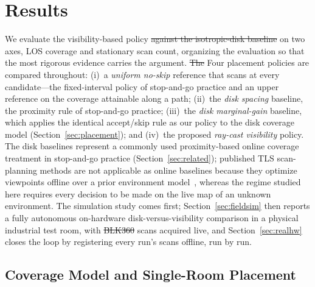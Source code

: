 \documentclass[sensors,article,submit,pdftex,moreauthors]{Definitions/mdpi}
\providecommand{\DIFadd}[1]{{\protect\color{blue} \sf #1}} %
\providecommand{\DIFdel}[1]{{\protect\color{red}\protect\scriptsize\protect\sout{#1}}} %
\providecommand{\DIFaddbegin}{} %
\providecommand{\DIFaddend}{} %
\providecommand{\DIFdelbegin}{} %
\providecommand{\DIFdelend}{} %
\begin{document}
\section{Results}
\label{sec:results}

We evaluate the visibility-based policy \DIFdelbegin \DIFdel{against the isotropic-disk baseline }\DIFdelend on two axes, LOS coverage and
stationary scan count, organizing the evaluation so that the most rigorous
evidence carries the argument. \DIFdelbegin \DIFdel{The }\DIFdelend \DIFaddbegin \DIFadd{Four placement policies are compared throughout:
(i)~a \emph{uniform no-skip} reference that scans at every candidate---the
fixed-interval policy of stop-and-go practice and an upper reference on the
coverage attainable along a path; (ii)~the \emph{disk spacing} baseline, the
proximity rule of stop-and-go practice; (iii)~the \emph{disk marginal-gain}
baseline, which applies the identical accept/skip rule as our policy to the
disk coverage model (Section~\ref{sec:placement}); and (iv)~the proposed
\emph{ray-cast visibility} policy. The disk baselines represent a commonly
used proximity-based online coverage treatment in stop-and-go practice
(Section~\ref{sec:related}); published TLS scan-planning methods are not
applicable as online baselines because they optimize viewpoints offline over a
prior environment model~\cite{tls-scanplanning,dehbi2021,knechtel2025},
whereas the regime studied here requires every decision to be made on the live
map of an unknown environment. The }\DIFaddend simulation study comes first;
Section~\ref{sec:fieldsim} then reports a fully autonomous on-hardware
disk-versus-visibility comparison in a physical industrial test room, with
\DIFdelbegin \DIFdel{BLK360 }\DIFdelend scans acquired live, and Section~\ref{sec:realhw} closes the loop by
registering every run's scans offline, run by run.

\subsection{Coverage Model and Single-Room Placement}
\end{document}
